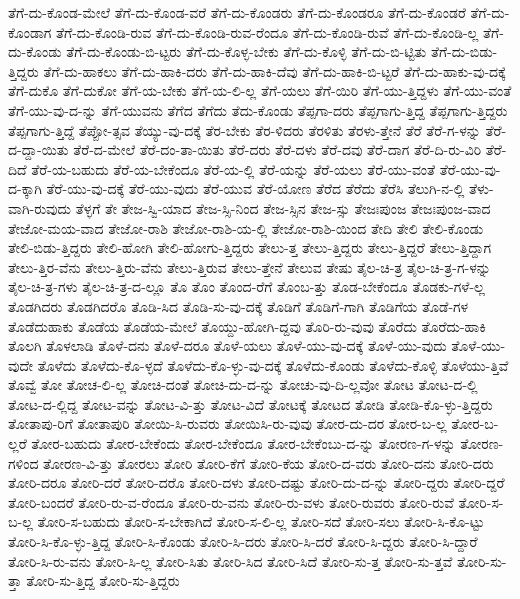 {ತೆಗೆ-ದು-ಕೊಂಡ-ಮೇಲೆ
ತೆಗೆ-ದು-ಕೊಂಡ-ವರೆ
ತೆಗೆ-ದು-ಕೊಂಡರು
ತೆಗೆ-ದು-ಕೊಂಡರೂ
ತೆಗೆ-ದು-ಕೊಂಡರೆ
ತೆಗೆ-ದು-ಕೊಂಡಾಗ
ತೆಗೆ-ದು-ಕೊಂಡಿ-ರುವ
ತೆಗೆ-ದು-ಕೊಂಡಿ-ರುವ-ರೆಂದೂ
ತೆಗೆ-ದು-ಕೊಂಡಿ-ರುವೆ
ತೆಗೆ-ದು-ಕೊಂಡಿ-ಲ್ಲ
ತೆಗೆ-ದು-ಕೊಂಡು
ತೆಗೆ-ದು-ಕೊಂಡು-ಬಿ-ಟ್ಟರು
ತೆಗೆ-ದು-ಕೊಳ್ಳ-ಬೇಕು
ತೆಗೆ-ದು-ಕೊಳ್ಳಿ
ತೆಗೆ-ದು-ಬಿ-ಟ್ಟಿತು
ತೆಗೆ-ದು-ಬಿಡು-ತ್ತಿದ್ದರು
ತೆಗೆ-ದು-ಹಾಕಲು
ತೆಗೆ-ದು-ಹಾಕಿ-ದರು
ತೆಗೆ-ದು-ಹಾಕಿ-ದೆವು
ತೆಗೆ-ದು-ಹಾಕಿ-ಬಿ-ಟ್ಟರೆ
ತೆಗೆ-ದು-ಹಾಕು-ವು-ದಕ್ಕೆ
ತೆಗೆ-ದುಕೊ
ತೆಗೆ-ದುಕೋ
ತೆಗೆ-ಯ-ಬೇಕು
ತೆಗೆ-ಯ-ಲಿ-ಲ್ಲ
ತೆಗೆ-ಯಲು
ತೆಗೆ-ಯಿರಿ
ತೆಗೆ-ಯು-ತ್ತಿದ್ದಳು
ತೆಗೆ-ಯು-ವಂತೆ
ತೆಗೆ-ಯು-ವು-ದ-ನ್ನು
ತೆಗೆ-ಯುವನು
ತೆಗೆದ
ತೆಗೆದು
ತೆದು-ಕೊಂಡು
ತೆಪ್ಪಗಾ-ದರು
ತೆಪ್ಪಗಾಗು-ತ್ತಿದ್ದ
ತೆಪ್ಪಗಾಗು-ತ್ತಿದ್ದರು
ತೆಪ್ಪಗಾಗು-ತ್ತಿದ್ದೆ
ತೆಪ್ಪೋ-ತ್ಸವ
ತೆಯ್ಯು-ವು-ದಕ್ಕೆ
ತೆರ-ಬೇಕು
ತೆರ-ಳಿದರು
ತೆರಳಿತು
ತೆರಳು-ತ್ತೇನೆ
ತೆರೆ
ತೆರೆ-ಗ-ಳನ್ನು
ತೆರೆ-ದ-ದ್ದಾ-ಯಿತು
ತೆರೆ-ದ-ಮೇಲೆ
ತೆರೆ-ದಂ-ತಾ-ಯಿತು
ತೆರೆ-ದರು
ತೆರೆ-ದಳು
ತೆರೆ-ದವು
ತೆರೆ-ದಾಗ
ತೆರೆ-ದಿ-ರು-ವಿರಿ
ತೆರೆ-ದಿದೆ
ತೆರೆ-ಯ-ಬಹುದು
ತೆರೆ-ಯ-ಬೇಕೆಂದೂ
ತೆರೆ-ಯ-ಲ್ಲಿ
ತೆರೆ-ಯನ್ನು
ತೆರೆ-ಯಲು
ತೆರೆ-ಯು-ವಂತೆ
ತೆರೆ-ಯು-ವು-ದ-ಕ್ಕಾಗಿ
ತೆರೆ-ಯು-ವು-ದಕ್ಕೆ
ತೆರೆ-ಯು-ವುದು
ತೆರೆ-ಯುವ
ತೆರೆ-ಯೋಣ
ತೆರೆದ
ತೆರೆದು
ತೆರೆಸಿ
ತೆಲುಗಿ-ನ-ಲ್ಲಿ
ತೆಳು-ವಾಗಿ-ರುವುದು
ತೆಳ್ಳಗೆ
ತೇ
ತೇಜ-ಸ್ವಿ-ಯಾದ
ತೇಜ-ಸ್ಸಿ-ನಿಂದ
ತೇಜ-ಸ್ಸಿನ
ತೇಜ-ಸ್ಸು
ತೇಜಃಪುಂಜ
ತೇಜಃಪುಂಜ-ವಾದ
ತೇಜೋ-ಮಯ-ವಾದ
ತೇಜೋ-ರಾಶಿ
ತೇಜೋ-ರಾಶಿ-ಯ-ಲ್ಲಿ
ತೇಜೋ-ರಾಶಿ-ಯಿಂದ
ತೇದಿ
ತೇಲಿ
ತೇಲಿ-ಕೊಂಡು
ತೇಲಿ-ಬಿಡು-ತ್ತಿದ್ದರು
ತೇಲಿ-ಹೋಗಿ
ತೇಲಿ-ಹೋಗು-ತ್ತಿದ್ದರು
ತೇಲು-ತ್ತ
ತೇಲು-ತ್ತಿದ್ದರು
ತೇಲು-ತ್ತಿದ್ದರೆ
ತೇಲು-ತ್ತಿದ್ದಾಗ
ತೇಲು-ತ್ತಿರ-ವೆನು
ತೇಲು-ತ್ತಿರು-ವೆನು
ತೇಲು-ತ್ತಿರುವ
ತೇಲು-ತ್ತೇನೆ
ತೇಲುವ
ತೇಷು
ತೈಲ-ಚಿ-ತ್ರ
ತೈಲ-ಚಿ-ತ್ರ-ಗ-ಳನ್ನು
ತೈಲ-ಚಿ-ತ್ರ-ಗಳು
ತೈಲ-ಚಿ-ತ್ರ-ದ-ಲ್ಲೂ
ತೊ
ತೊಂ
ತೊಂದ-ರೆಗೆ
ತೊಂಬ-ತ್ತು
ತೊಡ-ಬೇಕೆಂದೂ
ತೊಡಕು-ಗಳೆ-ಲ್ಲ
ತೊಡಗಿದರು
ತೊಡಗಿದರೊ
ತೊಡಿ-ಸಿದ
ತೊಡಿ-ಸು-ವು-ದಕ್ಕೆ
ತೊಡಿಗೆ
ತೊಡಿಗೆ-ಗಾಗಿ
ತೊಡಿಗೆಯ
ತೊಡೆ-ಗಳ
ತೊಡೆದುಹಾಕು
ತೊಡೆಯ
ತೊಡೆಯ-ಮೇಲೆ
ತೊಯ್ದು-ಹೋಗಿ-ದ್ದವು
ತೊರಿ-ರು-ವುವು
ತೊರೆದು
ತೊರೆದು-ಹಾಕಿ
ತೊಲಗಿ
ತೊಳಲಾಡಿ
ತೊಳೆ-ದನು
ತೊಳೆ-ದರೂ
ತೊಳೆ-ಯಲು
ತೊಳೆ-ಯು-ವು-ದಕ್ಕೆ
ತೊಳೆ-ಯು-ವುದು
ತೊಳೆ-ಯು-ವುದೇ
ತೊಳೆದು
ತೊಳೆದು-ಕೊ-ಳ್ಳದೆ
ತೊಳೆದು-ಕೊ-ಳ್ಳು-ವು-ದಕ್ಕೆ
ತೊಳೆದು-ಕೊಂಡು
ತೊಳೆದು-ಕೊಳ್ಳಿ
ತೊಳೆಯು-ತ್ತಿವೆ
ತೊವ್ವೆ
ತೋ
ತೋಚ-ಲಿ-ಲ್ಲ
ತೋಚಿ-ದಂತೆ
ತೋಚಿ-ದು-ದ-ನ್ನು
ತೋಚು-ವು-ದಿ-ಲ್ಲವೋ
ತೋಟ
ತೋಟ-ದ-ಲ್ಲಿ
ತೋಟ-ದ-ಲ್ಲಿದ್ದ
ತೋಟ-ವನ್ನು
ತೋಟ-ವಿ-ತ್ತು
ತೋಟ-ವಿದೆ
ತೋಟಕ್ಕೆ
ತೋಟದ
ತೋಡಿ
ತೋಡಿ-ಕೊ-ಳ್ಳು-ತ್ತಿದ್ದರು
ತೋತಾಪು-ರಿಗೆ
ತೋತಾಪುರಿ
ತೋಯಿ-ಸಿ-ರುವರು
ತೋಯಿಸಿ-ರು-ವುವು
ತೋರ-ದು-ದರ
ತೋರ-ಬ-ಲ್ಲ
ತೋರ-ಬ-ಲ್ಲರೆ
ತೋರ-ಬಹುದು
ತೋರ-ಬೇಕೆಂದು
ತೋರ-ಬೇಕೆಂದೂ
ತೋರ-ಬೇಕೆಂಬು-ದ-ನ್ನು
ತೋರಣ-ಗ-ಳನ್ನು
ತೋರಣ-ಗಳಿಂದ
ತೋರಣ-ವಿ-ತ್ತು
ತೋರಲು
ತೋರಿ
ತೋರಿ-ಕೆಗೆ
ತೋರಿ-ಕೆಯ
ತೋರಿ-ದ-ವರು
ತೋರಿ-ದನು
ತೋರಿ-ದರು
ತೋರಿ-ದರೂ
ತೋರಿ-ದರೆ
ತೋರಿ-ದರೊ
ತೋರಿ-ದಳು
ತೋರಿ-ದಷ್ಟು
ತೋರಿ-ದು-ದ-ನ್ನು
ತೋರಿ-ದ್ದರು
ತೋರಿ-ದ್ದರೆ
ತೋರಿ-ಬಂದರೆ
ತೋರಿ-ರು-ವ-ರೆಂದೂ
ತೋರಿ-ರು-ವನು
ತೋರಿ-ರು-ವಳು
ತೋರಿ-ರುವರು
ತೋರಿ-ರುವೆ
ತೋರಿ-ಸ-ಬ-ಲ್ಲ
ತೋರಿ-ಸ-ಬಹುದು
ತೋರಿ-ಸ-ಬೇಕಾಗಿದೆ
ತೋರಿ-ಸ-ಲಿ-ಲ್ಲ
ತೋರಿ-ಸದೆ
ತೋರಿ-ಸಲು
ತೋರಿ-ಸಿ-ಕೊ-ಟ್ಟು
ತೋರಿ-ಸಿ-ಕೊ-ಳ್ಳು-ತ್ತಿದ್ದ
ತೋರಿ-ಸಿ-ಕೊಂಡು
ತೋರಿ-ಸಿ-ದರು
ತೋರಿ-ಸಿ-ದರೆ
ತೋರಿ-ಸಿ-ದ್ದರು
ತೋರಿ-ಸಿ-ದ್ದಾರೆ
ತೋರಿ-ಸಿ-ರು-ವನು
ತೋರಿ-ಸಿ-ಲ್ಲ
ತೋರಿ-ಸಿತು
ತೋರಿ-ಸಿದ
ತೋರಿ-ಸಿದೆ
ತೋರಿ-ಸು-ತ್ತ
ತೋರಿ-ಸು-ತ್ತವೆ
ತೋರಿ-ಸು-ತ್ತಾ
ತೋರಿ-ಸು-ತ್ತಿದ್ದ
ತೋರಿ-ಸು-ತ್ತಿದ್ದರು
}
